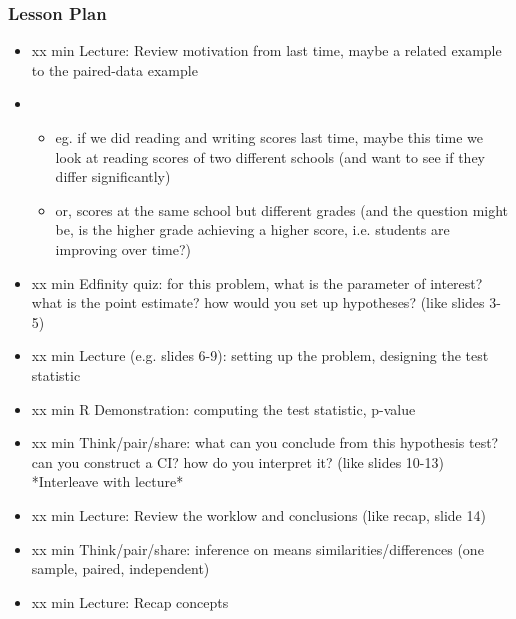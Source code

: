 \begin{frame}
    \frametitle{Lesson Plan}
    \begin{itemize}
        \item xx min Lecture: Review motivation from last time, maybe a related example to the paired-data example
        \item \begin{itemize}
            \item eg. if we did reading and writing scores last time, maybe this time we look at reading scores of two different schools (and want to see if they differ significantly)
            \item or, scores at the same school but different grades (and the question might be, is the higher grade achieving a higher score, i.e. students are improving over time?)
        \end{itemize}
        \item xx min Edfinity quiz: for this problem, what is the parameter of interest? what is the point estimate? how would you set up hypotheses? (like slides 3-5)
        \item xx min Lecture (e.g. slides 6-9): setting up the problem, designing the test statistic
        \item xx min R Demonstration: computing the test statistic, p-value
        \item xx min Think/pair/share: what can you conclude from this hypothesis test? can you construct a CI? how do you interpret it? (like slides 10-13) *Interleave with lecture*
        \item xx min Lecture: Review the worklow and conclusions (like recap, slide 14)
        \item xx min Think/pair/share: inference on means similarities/differences (one sample, paired, independent)
        \item xx min Lecture: Recap concepts
    \end{itemize}
\end{frame}

